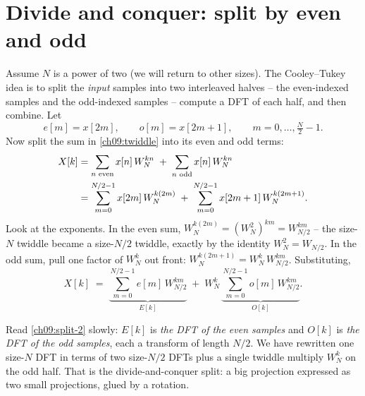 \section{Divide and conquer: split by even and odd}
\label{ch09:split}

Assume $N$ is a power of two (we will return to other sizes). The Cooley--Tukey idea is
to split the \emph{input} samples into two interleaved halves -- the even-indexed
samples and the odd-indexed samples -- compute a DFT of each half, and then combine. Let
\begin{equation}
\label{ch09:eo-defn}
e[m] = x[2m], \qquad o[m] = x[2m+1], \qquad m = 0,\dots, \tfrac{N}{2}-1 .
\end{equation}
Now split the sum in \eqref{ch09:twiddle} into its even and odd terms:
\begin{align}
X[k]
&= \sum_{n \text{ even}} x[n]\,W_N^{kn} \;+\; \sum_{n \text{ odd}} x[n]\,W_N^{kn} \notag\\
&= \sum_{m=0}^{N/2-1} x[2m]\,W_N^{k(2m)}
   \;+\; \sum_{m=0}^{N/2-1} x[2m+1]\,W_N^{k(2m+1)} .
\label{ch09:split-1}
\end{align}
Look at the exponents. In the even sum, $W_N^{k(2m)} = (W_N^{2})^{km} = W_{N/2}^{km}$ --
the size-$N$ twiddle became a size-$N/2$ twiddle, exactly by the identity $W_N^2 =
W_{N/2}$. In the odd sum, pull one factor of $W_N^{k}$ out front:
$W_N^{k(2m+1)} = W_N^{k}\,W_{N/2}^{km}$. Substituting,
\begin{equation}
\label{ch09:split-2}
X[k] \;=\; \underbrace{\sum_{m=0}^{N/2-1} e[m]\,W_{N/2}^{km}}_{\displaystyle E[k]}
\;+\; W_N^{k}\,\underbrace{\sum_{m=0}^{N/2-1} o[m]\,W_{N/2}^{km}}_{\displaystyle O[k]}.
\end{equation}

\begin{happeningbox}
Read \eqref{ch09:split-2} slowly: $E[k]$ is \emph{the DFT of the even samples} and
$O[k]$ is \emph{the DFT of the odd samples}, each a transform of length $N/2$. We have
rewritten one size-$N$ DFT in terms of two size-$N/2$ DFTs plus a single twiddle
multiply $W_N^k$ on the odd half. That is the divide-and-conquer split: a big projection
expressed as two small projections, glued by a rotation.
\end{happeningbox}

